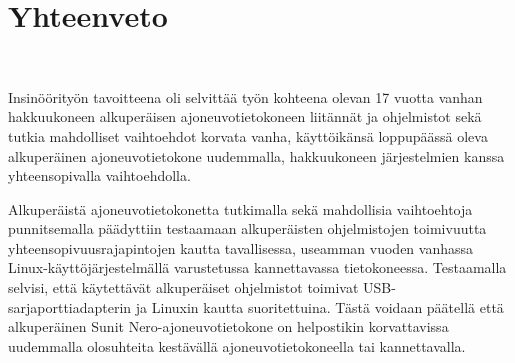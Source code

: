 





\newpage

\chapter{Yhteenveto}\

Insinöörityön tavoitteena oli selvittää työn kohteena olevan 17 vuotta vanhan hakkuukoneen alkuperäisen ajoneuvotietokoneen liitännät ja ohjelmistot sekä tutkia mahdolliset vaihtoehdot korvata vanha, käyttöikänsä loppupäässä oleva alkuperäinen ajoneuvotietokone uudemmalla, hakkuukoneen järjestelmien kanssa yhteensopivalla vaihtoehdolla.

Alkuperäistä ajoneuvotietokonetta tutkimalla sekä mahdollisia vaihtoehtoja punnitsemalla päädyttiin testaamaan alkuperäisten ohjelmistojen toimivuutta yhteensopivuusrajapintojen kautta tavallisessa, useamman vuoden vanhassa Linux-käyttöjärjestelmällä varustetussa kannettavassa tietokoneessa. Testaamalla selvisi, että käytettävät alkuperäiset ohjelmistot toimivat USB-sarjaporttiadapterin ja Linuxin kautta suoritettuina. Tästä voidaan päätellä että alkuperäinen Sunit Nero-ajoneuvotietokone on helpostikin korvattavissa uudemmalla olosuhteita kestävällä ajoneuvotietokoneella tai kannettavalla.

